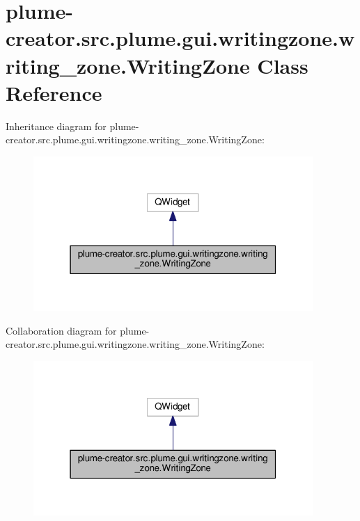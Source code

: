 \hypertarget{classplume-creator_1_1src_1_1plume_1_1gui_1_1writingzone_1_1writing__zone_1_1_writing_zone}{}\section{plume-\/creator.src.\+plume.\+gui.\+writingzone.\+writing\+\_\+zone.\+Writing\+Zone Class Reference}
\label{classplume-creator_1_1src_1_1plume_1_1gui_1_1writingzone_1_1writing__zone_1_1_writing_zone}


Inheritance diagram for plume-\/creator.src.\+plume.\+gui.\+writingzone.\+writing\+\_\+zone.\+Writing\+Zone\+:\nopagebreak
\begin{figure}[H]
\begin{center}
\leavevmode
\includegraphics[width=301pt]{classplume-creator_1_1src_1_1plume_1_1gui_1_1writingzone_1_1writing__zone_1_1_writing_zone__inherit__graph}
\end{center}
\end{figure}


Collaboration diagram for plume-\/creator.src.\+plume.\+gui.\+writingzone.\+writing\+\_\+zone.\+Writing\+Zone\+:\nopagebreak
\begin{figure}[H]
\begin{center}
\leavevmode
\includegraphics[width=301pt]{classplume-creator_1_1src_1_1plume_1_1gui_1_1writingzone_1_1writing__zone_1_1_writing_zone__coll__graph}
\end{center}
\end{figure}
